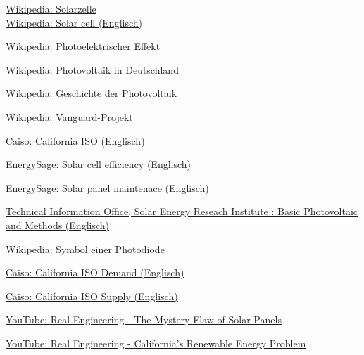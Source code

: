 \newpage
\begin{thebibliography}{9}
        \href{https://de.wikipedia.org/wiki/Solarzelle}{
            Wikipedia: Solarzelle
        }\\
        \href{https://en.wikipedia.org/wiki/Solar_cell}{
            Wikipedia: Solar cell (Englisch)
        }

        \href{https://de.wikipedia.org/wiki/Photoelektrischer_Effekt}{
            Wikipedia: Photoelektrischer Effekt
        }

        \href{https://de.wikipedia.org/wiki/Photovoltaik_in_Deutschland}{
            Wikipedia: Photovoltaik in Deutschland
        }

        \href{https://de.wikipedia.org/wiki/Geschichte_der_Photovoltaik}{
            Wikipedia: Geschichte der Photovoltaik
        }

        \href{https://de.wikipedia.org/wiki/Vanguard-Projekt}{
            Wikipedia: Vanguard-Projekt
        }

        \href{http://www.caiso.com/TodaysOutlook/Pages/index.html}{
            Caiso: California ISO (Englisch)
        }

        \href{https://news.energysage.com/what-are-the-most-efficient-solar-panels-on-the-market/}{
            EnergySage: Solar cell efficiency (Englisch)
        }

        \href{https://www.energysage.com/solar/101/solar-panel-maintenance/}{
            EnergySage: Solar panel maintenace (Englisch)
        }

        \href{https://www.nrel.gov/docs/legosti/old/1448.pdf}{
            Technical Information Office, Solar Energy Reseach Institute
            : Basic Photovoltaic and Methods (Englisch)
        }

        \href{https://de.wikipedia.org/wiki/Datei:Symbol_Photodiode.svg}{
            Wikipedia: Symbol einer Photodiode
        }

        \href{http://www.caiso.com/TodaysOutlook/Pages/index.html}{
            Caiso: California ISO Demand (Englisch)
        }

        \href{http://www.caiso.com/TodaysOutlook/Pages/supply.html}{
            Caiso: California ISO Supply (Englisch)
        }

        \href{https://www.youtube.com/watch?v=yVOnHWnLSeU}{
            YouTube: Real Engineering - The Mystery Flaw of Solar Panels
        }

        \href{https://www.youtube.com/watch?v=h5cm7HOAqZY}{
            YouTube: Real Engineering - California's Renewable Energy Problem
        }
\end{thebibliography}